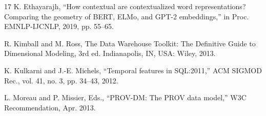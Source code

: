 \documentclass[conference,a4paper]{IEEEtran}
\begin{document}
\begin{thebibliography}{17}
 K. Ethayarajh, ``How contextual are contextualized word representations? Comparing the geometry of BERT, ELMo, and GPT-2 embeddings,'' in Proc. EMNLP-IJCNLP, 2019, pp. 55--65.

 R. Kimball and M. Ross, The Data Warehouse Toolkit: The Definitive Guide to Dimensional Modeling, 3rd ed. Indianapolis, IN, USA: Wiley, 2013.

 K. Kulkarni and J.-E. Michels, ``Temporal features in SQL:2011,'' ACM SIGMOD Rec., vol. 41, no. 3, pp. 34--43, 2012.

 L. Moreau and P. Missier, Eds., ``PROV-DM: The PROV data model,'' W3C Recommendation, Apr. 2013.

\end{thebibliography}
\end{document}
